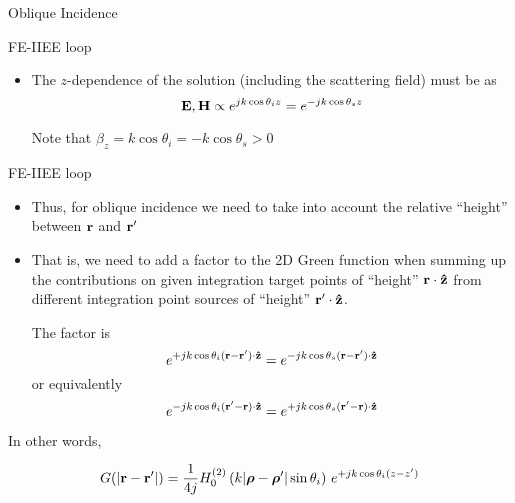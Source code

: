 \begin{frame}[allowframebreaks]{Oblique Incidence}
\begin{block}{FE-IIEE loop}
\begin{itemize}
      \item The $z$-dependence of the solution (including the scattering field) must be as
        \begin{equation*}
          \mathbf{E},\mathbf{H} \propto   e^{j k \cos\theta_i z} =   e^{-j k \cos\theta_s z}
        \end{equation*}

        Note that $\beta_z=k\cos\theta_i=-k\cos\theta_s>0$
        
      \end{itemize}
    \end{block}

        
    \begin{block}{FE-IIEE loop \insertcontinuationtext}
      \begin{itemize}
      \item Thus, for oblique incidence we need to take into account
        the relative ``height'' between $\mathbf{r}$ and $\mathbf{r^\prime}$

      \item That is, we need to add a factor to the 2D Green function
        when summing up the contributions on given integration target
        points of ``height'' $\mathbf{r}\cdot\mathbf{\hat{z}}$ from different
        integration point sources of ``height'' $\mathbf{r^\prime}\cdot\mathbf{\hat{z}}$.

        \vbss
        
        The factor is
        \begin{equation*}
          e^{+j k \cos\theta_i (\mathbf{r}-\mathbf{r^\prime})\cdot\mathbf{\hat{z}}}
          =   e^{-j k \cos\theta_s (\mathbf{r}-\mathbf{r^\prime})\cdot\mathbf{\hat{z}}} 
        \end{equation*}
        or equivalently 
        \begin{equation*}
          e^{-j k \cos\theta_i (\mathbf{r^\prime}-\mathbf{r})\cdot\mathbf{\hat{z}}}
          =   e^{+j k \cos\theta_s (\mathbf{r^\prime}-\mathbf{r})\cdot\mathbf{\hat{z}}}
        \end{equation*}
        
      \end{itemize}
    \end{block}

    \newpage 
    
    \begin{block}{In other words,}
      
      \begin{equation*}
        G(|\mathbf{r}-\mathbf{r^\prime}|) = \dfrac{1}{4j}
        H_0^{(2)}\left( k|\boldsymbol{\rho}-\boldsymbol{\rho}^\prime|\sin\theta_i\right) \,
        e^{+j k \cos\theta_i (z-z^\prime)}
      \end{equation*}


\end{block}
\end{frame}
